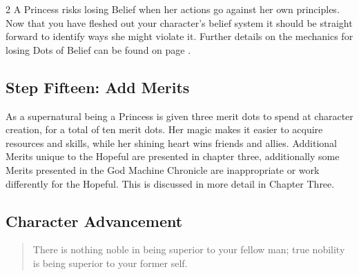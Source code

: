 \begin{multicols}{2}
\noindent A Princess risks losing Belief when her actions go against her own principles. Now that you have fleshed out your character's belief system it should be straight forward to identify ways she might violate it. Further details on the mechanics for losing Dots of Belief can be found on page \pageref{subsec:Belief}.

\subsection*{Step Fifteen: Add Merits} 

As a supernatural being a Princess is given three merit dots to spend at character creation, for a total of ten merit dots. Her magic makes it easier to acquire resources and skills, while her shining heart wins friends and allies. Additional Merits unique to the Hopeful are presented in chapter three, additionally some Merits presented in the God Machine Chronicle are inappropriate or work differently for the Hopeful. This is discussed in more detail in Chapter Three. 




\bigsidebarstart

\subsection*{Character Advancement}

\begin{quote}There is nothing noble in being superior to your fellow man; true nobility is being superior to your former self.\\
 \end{quote}


\end{multicols}
